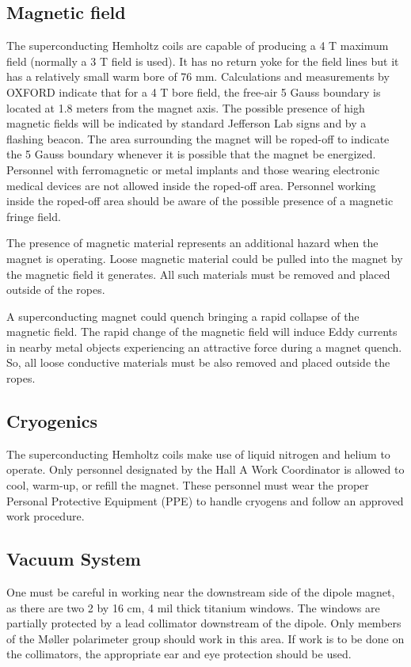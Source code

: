 \begin{safetyen}{0}{0}
\subsection{Magnetic field}
The superconducting Hemholtz coils are capable of producing a 4 T maximum field (normally a 3 T field
is used). It has no return yoke for the field lines but it has a relatively small warm bore of 76 mm.
Calculations and measurements by OXFORD indicate that for a 4 T bore field,
the free-air 5 Gauss boundary is located at 1.8 meters
from the magnet axis.
The possible presence of high magnetic fields will be indicated by
standard Jefferson Lab signs and by a flashing beacon. The area surrounding 
the magnet will be roped-off to indicate the 5 Gauss boundary
whenever it is possible that the magnet be 
energized.
Personnel with ferromagnetic or metal implants and those 
wearing electronic medical devices are not allowed inside the roped-off area. 
Personnel working inside the roped-off area 
should be aware of the possible presence of a magnetic fringe field.

The presence of magnetic material
represents an additional hazard when the magnet is operating.
Loose magnetic material could be pulled into the magnet by the magnetic field it generates.
All such materials must 
be removed and placed outside of the ropes.

A superconducting magnet could quench bringing a rapid collapse of the magnetic field.
The rapid change of the magnetic field will induce Eddy currents in nearby metal objects
experiencing an attractive force during a magnet quench. So, all loose conductive materials
must be also removed and placed outside the ropes.

\subsection{Cryogenics}
The superconducting Hemholtz coils make use of liquid nitrogen and helium to operate.
 Only personnel designated by the Hall A Work Coordinator is allowed to cool, warm-up,
 or refill the magnet. These personnel must wear the proper Personal Protective Equipment (PPE) to handle cryogens and follow
 an approved work procedure.

\subsection{Vacuum System}

One must be careful in working near the downstream side of the dipole
magnet, as there are two 2 by 16 cm, 4 mil thick titanium windows.
The windows are partially protected by a lead collimator downstream
of the dipole. 
Only members of the M{\o}ller polarimeter group should work in this
area. 
If work is to be done on the collimators, the appropriate ear
and eye protection should be used.


\end{safetyen}
